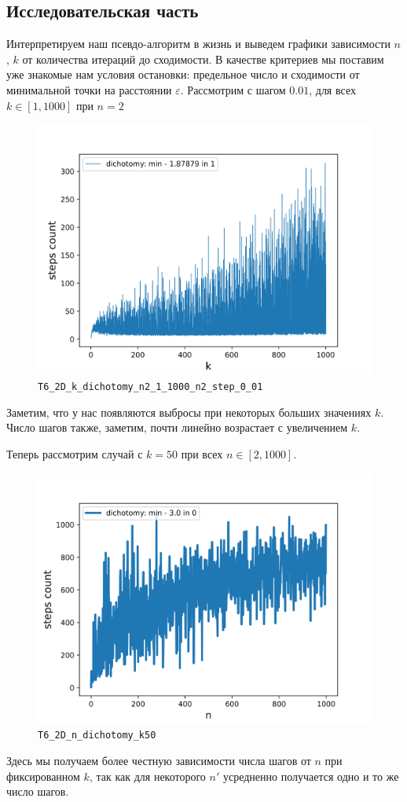 \documentclass[12pt, a4paper, oneside, final]{article}
\begin{document}
	\subsection*{Исследовательская часть}
	Интерпретируем наш псевдо-алгоритм в жизнь и выведем графики зависимости $n$, $k$ от количества итераций до сходимости. В качестве критериев мы поставим уже знакомые нам условия остановки: предельное число и сходимости от минимальной точки на расстоянии $\varepsilon$. Рассмотрим с шагом $0.01$, для всех $k \in [1, 1000]$ при $n = 2$
	\begin{figure}[H]
		\centering
	 	\includegraphics[scale=0.78]{HQ/T6_2D_k_dichotomy_n2_1_1000_n2_step_0_01.png}
		\caption*{\texttt{T6\_2D\_k\_dichotomy\_n2\_1\_1000\_n2\_step\_0\_01}}
	\end{figure}
	Заметим, что у нас появляются выбросы при некоторых больших значениях $k$. Число шагов также, заметим, почти линейно возрастает с увеличением $k$.

	Теперь рассмотрим случай с $k = 50$ при всех $n \in [2, 1000]$.
	\begin{figure}[H]
		\centering
		\includegraphics[scale=0.78]{HQ/T6_2D_n_dichotomy_k50.png}
		\caption*{\texttt{T6\_2D\_n\_dichotomy\_k50}}
	\end{figure}
	Здесь мы получаем более честную зависимости числа шагов от $n$ при фиксированном $k$, так как для некоторого $n'$ усредненно получается одно и то же число шагов.
	\newpage
\end{document}
